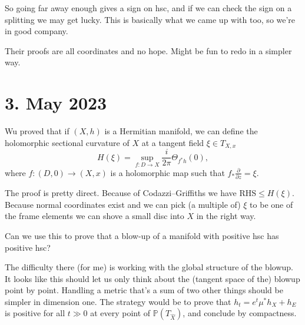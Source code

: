 \documentclass[11pt]{article}
\theoremstyle{definition}
\newcommand{\kk}[1]{\mathbb{#1}}
\begin{document}
So going far away enough gives a sign on hsc, and if we can check the sign on a
splitting we may get lucky.
This is basically what we came up with too, so we're in good company.

Their proofs are all coordinates and no hope.
Might be fun to redo in a simpler way.



\section{3. May 2023}

Wu proved that if $(X,h)$ is a Hermitian manifold, we can define the
holomorphic sectional curvature of $X$ at a tangent field $\xi \in T_{X,x}$
$$
H(\xi) = \sup_{f:D\to X}\frac{i}{2\pi}\Theta_{f^*h}(0),
$$
where $f : (D,0) \to (X,x)$ is a holomorphic map such that
$f_*\frac{\partial}{\partial z} = \xi$.

The proof is pretty direct.
Because of Codazzi--Griffiths we have $\text{RHS} \leq H(\xi)$.
Because normal coordinates exist and we can pick (a multiple of) $\xi$ to be
one of the frame elements we can shove a small disc into $X$ in the right way.

Can we use this to prove that a blow-up of a manifold with positive hsc has
positive hsc?

The difficulty there (for me) is working with the global structure of the blowup.
It looks like this should let us only think about the (tangent space of the)
blowup point by point.
Handling a metric that's a sum of two other things should be simpler in
dimension one.
The strategy would be to prove that $h_t = e^t \mu^* h_X + h_{E}$ is positive
for all $t \gg 0$ at every point of $\kk P(T_{\widehat X})$, and conclude by
compactness.
\end{document}
